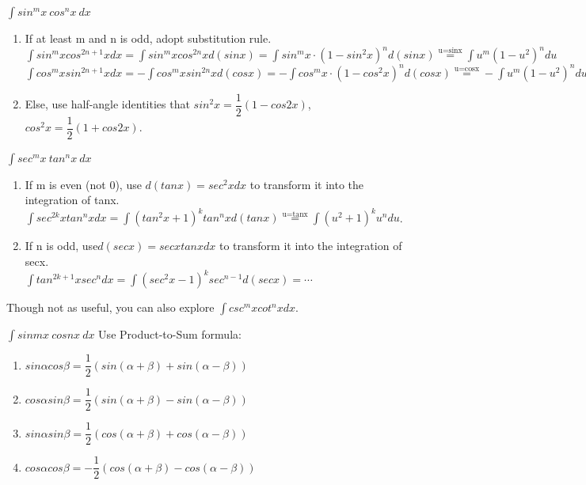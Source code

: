 \begin{frame}{$\int sin^mx\ cos^nx\ dx$}
    \begin{enumerate}
        \item If at least m and n is odd, adopt substitution rule.
              \bigskip
              $\int sin^mxcos^{2n+1}xdx=\int sin^mxcos^{2n}xd(sinx)=\int sin^mx\cdot(1-sin^2x)^nd(sinx)\overset{\text{u=sinx}}{=}\int u^m(1-u^2)^ndu$\\
              \bigskip
              $\int cos^mxsin^{2n+1}xdx=-\int cos^mxsin^{2n}xd(cosx)=-\int cos^mx\cdot(1-cos^2x)^nd(cosx)\overset{\text{u=cosx}}{=}-\int u^m(1-u^2)^ndu$\\
              \bigskip
        \item Else, use half-angle identities that $sin^2x=\dfrac{1}{2}(1-cos2x)$, $cos^2x=\dfrac{1}{2}(1+cos2x)$.

    \end{enumerate}
\end{frame}

\begin{frame}{$\int sec^mx\ tan^nx\ dx$}
    \begin{enumerate}
        \item If m is even (not 0), use $d(tanx)=sec^2xdx$ to transform it into the integration of tanx.\\
              \bigskip
              $\int sec^{2k}xtan^nxdx=\int (tan^2x+1)^ktan^nxd(tanx)\overset{\text{u=tanx}}{=}\int (u^2+1)^ku^ndu$.
        \item If n is odd, use$d(secx)=secxtanxdx$ to transform it into the integration of secx.\\
              \bigskip
              $\int tan^{2k+1}xsec^ndx=\int (sec^2x-1)^ksec^{n-1}d(secx)=\cdots$
    \end{enumerate}
    Though not as useful, you can also explore $\int csc^mxcot^nxdx$.
\end{frame}

\begin{frame}{$\int sin mx\ cos nx\ dx$}
    Use Product-to-Sum formula:
    \begin{enumerate}
        \item $sin\alpha cos\beta=\dfrac{1}{2}(sin(\alpha+\beta)+sin(\alpha-\beta))$
        \item $cos\alpha sin\beta=\dfrac{1}{2}(sin(\alpha+\beta)-sin(\alpha-\beta))$
        \item $sin\alpha sin\beta=\dfrac{1}{2}(cos(\alpha+\beta)+cos(\alpha-\beta))$
        \item $cos\alpha cos\beta=-\dfrac{1}{2}(cos(\alpha+\beta)-cos(\alpha-\beta))$
    \end{enumerate}
\end{frame}



